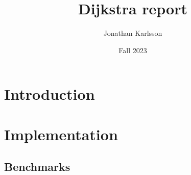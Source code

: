 \documentclass[a4paper,11pt]{article}
\begin{document}
\title{
    \textbf{Dijkstra report}
}
\author{Jonathan Karlsson}
\date{Fall 2023}

\maketitle

\section*{Introduction}



\section*{Implementation}

\subsection*{Benchmarks}
\end{document}
